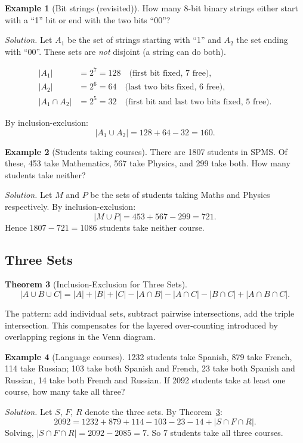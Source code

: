 \documentclass[11pt, a4paper, notitlepage]{report}
\newtheorem{theorem}{Theorem}[section]
\theoremstyle{definition}
\newtheorem{example}[theorem]{Example}
\theoremstyle{remark}
\begin{document}
\begin{example}[Bit strings (revisited)]
\label{ex:bitstringIE}
How many 8-bit binary strings either start with a ``1'' bit or end with the two bits ``00''?

\textit{Solution.} Let $A_1$ be the set of strings starting with ``1'' and $A_2$ the set
ending with ``00''. These sets are \emph{not} disjoint (a string can do both).

\begin{align*}
  |A_1| &= 2^7 = 128 \quad \text{(first bit fixed, 7 free)}, \\
  |A_2| &= 2^6 = 64 \quad \text{(last two bits fixed, 6 free)}, \\
  |A_1 \cap A_2| &= 2^5 = 32 \quad \text{(first bit and last two bits fixed, 5 free)}.
\end{align*}

By inclusion-exclusion:
\[
  |A_1 \cup A_2| = 128 + 64 - 32 = 160.
\]
\end{example}

\begin{example}[Students taking courses]
There are 1807 students in SPMS. Of these, 453 take Mathematics, 567 take Physics, and 299
take both. How many students take neither?

\textit{Solution.} Let $M$ and $P$ be the sets of students taking Maths and Physics
respectively. By inclusion-exclusion:
\[
  |M \cup P| = 453 + 567 - 299 = 721.
\]
Hence $1807 - 721 = 1086$ students take neither course.
\end{example}

\subsection{Three Sets}

\begin{theorem}[Inclusion-Exclusion for Three Sets]
\label{thm:ie3}
\[
  |A \cup B \cup C| = |A| + |B| + |C| - |A \cap B| - |A \cap C| - |B \cap C| + |A \cap B \cap C|.
\]
\end{theorem}

The pattern: add individual sets, subtract pairwise intersections, add the triple intersection.
This compensates for the layered over-counting introduced by overlapping regions in the Venn
diagram.

\begin{example}[Language courses]
1232 students take Spanish, 879 take French, 114 take Russian; 103 take both Spanish and
French, 23 take both Spanish and Russian, 14 take both French and Russian. If 2092 students
take at least one course, how many take all three?

\textit{Solution.} Let $S$, $F$, $R$ denote the three sets. By Theorem~\ref{thm:ie3}:
\[
  2092 = 1232 + 879 + 114 - 103 - 23 - 14 + |S \cap F \cap R|.
\]
Solving, $|S \cap F \cap R| = 2092 - 2085 = 7$. So 7 students take all three courses.
\end{example}
\end{document}
